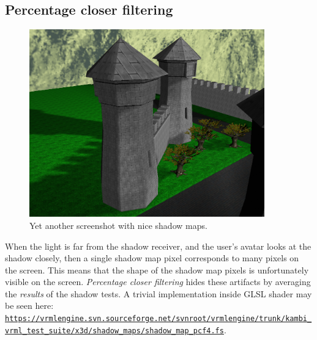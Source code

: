 \documentclass{acmsiggraph}                     %
\newcommand*{\myhref}[2]{\texttt{\href{#1}{\nolinkurl{#2}}}}
\begin{document}
\subsection{Percentage closer filtering}

\begin{figure}[b]
  \centering
  \includegraphics[width=4.0in]{sunny_street_above_view}
  \caption{Yet another screenshot with nice shadow maps.}
\end{figure}

When the light is far from the shadow receiver, and the user's avatar
looks at the shadow closely, then a single shadow map pixel
corresponds to many pixels on the screen. This means that the shape
of the shadow map pixels is unfortunately visible on the screen.
\emph{Percentage closer filtering} \cite{gpugems:pcf} hides these artifacts by
averaging
the \emph{results} of the shadow tests.
A trivial implementation inside GLSL shader may be seen here:
\myhref{https://vrmlengine.svn.sourceforge.net/svnroot/vrmlengine/trunk/kambi\_vrml\_test\_suite/x3d/shadow\_maps/shadow\_map\_pcf4.fs}{https://vrmlengine.svn.sourceforge.net/svnroot/vrmlengine/trunk/kambi_vrml_test_suite/x3d/shadow_maps/shadow_map_pcf4.fs}.
\end{document}
